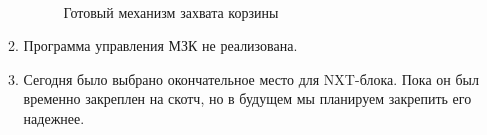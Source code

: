 \begin{enumerate}
\begin{enumerate}
		\begin{figure}[H]
			\begin{minipage}[h]{0.47\linewidth}
			\end{minipage}
			\begin{minipage}[h]{0.47\linewidth}
			\end{minipage}
			\caption{Готовый механизм захвата корзины}
		\end{figure}
		
		\item Программа управления МЗК не реализована.
		
		\item Сегодня было выбрано окончательное место для NXT-блока. Пока он был временно закреплен на скотч, но в будущем мы планируем закрепить его надежнее.
		

\end{enumerate}
\end{enumerate}
